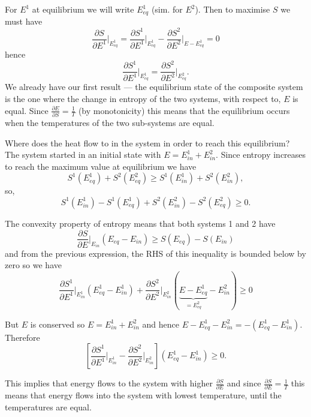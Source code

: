 For $E^1$ at equilibrium we will write $E^1_{eq}$ (sim. for $E^2$). Then to maximise $S$ we must have
$$
	\frac{\partial S}{\partial E^1}\bigg\vert_{E^1_{eq}} = \frac{\partial S^1}{\partial E^1}\bigg\vert_{E^1_{eq}} - \frac{\partial S^2}{\partial E^2}\bigg\vert_{E-E^1_{eq}}=0
$$
hence
$$
	\frac{\partial S^1}{\partial E^1}\vert_{E^1_{eq}} = \frac{\partial S^2}{\partial E^2}\vert_{E_{eq}^2}.
$$ We already have our first result --- the equilibrium state of the composite system is the one where the change in entropy of the two systems, with respect to, $E$ is equal. Since $\frac{\partial E}{\partial S} = \frac{1}{T}$ (by monotonicity) this means that the equilibrium occurs when the temperatures of the two sub-systems are equal.

Where does the heat flow to in the system in order to reach this equilibrium? The system started in an initial state with $E = E^1_{in}+E^2_{in}$. Since entropy increases to reach the maximum value at equilibrium we have 
$$
	S^1(E^1_{eq}) + S^2(E^2_{eq}) \geq S^1(E^1_{in}) + S^2(E^2_{in}),
$$ 
so,
$$ 
	S^1(E^1_{in}) - S^1(E^1_{eq})  +  S^2(E^2_{in}) - S^2(E^2_{eq})\geq 0.
$$

The convexity property of entropy means that both systems  1 and 2 have 
$$
	\frac{\partial S}{\partial E}\vert_{E_{in}}(E_{eq}-E_{in})\geq S(E_{eq})-S(E_{in})
$$ 
and from the previous expression, the RHS of this inequality is bounded below by zero so we have
$$
	\frac{\partial S^1}{\partial E^1}\bigg\vert_{E^1_{in}}(E_{eq}^1-E_{in}^1) + \frac{\partial S^2}{\partial E^2}\bigg\vert_{E^2_{in}}(\underbrace{E-E_{eq}^1}_{=E^2_{eq}}-E_{in}^2)\geq0
$$

But $E$ is conserved so $E=E^1_{in}+E^2_{in}$ and hence $E-E^1_{eq}-E^2_{in} = -(E^1_{eq}-E^1_{in})$. Therefore
$$
	\left[\frac{\partial S^1}{\partial E^1}\bigg\vert_{E^1_{in}} - \frac{\partial S^2}{\partial E^2}\bigg\vert_{E^2_{in}}\right]\left(E^1_{eq}-E^1_{in}\right)\geq 0.
$$

This implies that energy flows to the  system with higher $\frac{\partial S}{\partial E}$ and since $\frac{\partial S}{\partial E}= \frac{1}{T}$ this means that energy flows into the system with lowest temperature, until the temperatures are equal.

